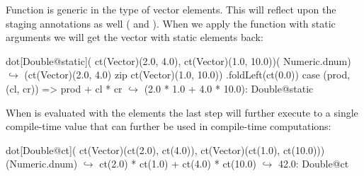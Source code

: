 Function  is generic in the type of vector elements. This will reflect
upon the staging annotations as well ( and ). When we apply the
 function with static arguments we will get the vector with static elements back:

\begin{lstparagraph}
dot[Double@static](
  ct(Vector)(2.0, 4.0), ct(Vector)(1.0, 10.0))(
  Numeric.dnum)
$\hookrightarrow$
  (ct(Vector)(2.0, 4.0) zip ct(Vector)(1.0, 10.0))
    .foldLeft(ct(0.0)) {
      case (prod, (cl, cr)) => prod + cl * cr
    }
$\hookrightarrow$ (2.0 * 1.0 + 4.0 * 10.0): Double@static
\end{lstparagraph}

When  is evaluated with the  elements the last step will further
execute to a single compile-time value that can further be used in compile-time computations:
\begin{lstparagraph}
dot[Double@ct](
  ct(Vector)(ct(2.0), ct(4.0)),
  ct(Vector)(ct(1.0), ct(10.0)))(Numeric.dnum)
$\hookrightarrow$ ct(2.0) * ct(1.0) + ct(4.0) * ct(10.0)
$\hookrightarrow$ 42.0: Double@ct
\end{lstparagraph}
